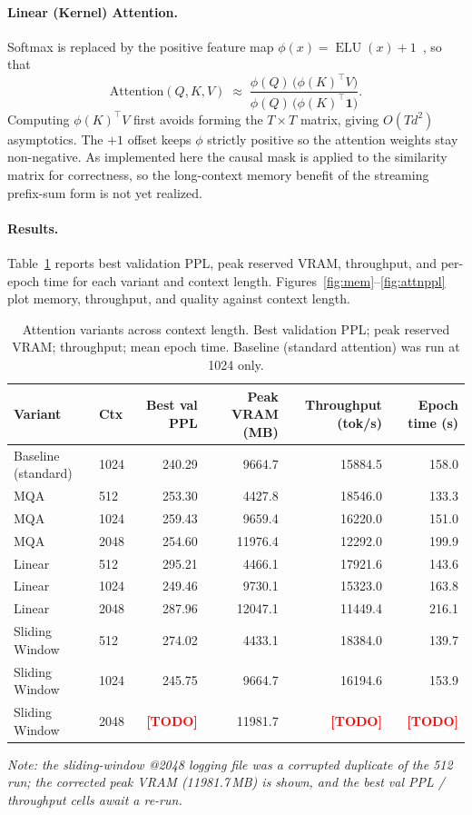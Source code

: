 \documentclass[11pt]{article}
\begin{document}
\paragraph{Linear (Kernel) Attention.} Softmax is replaced by the positive
feature map $\phi(x)=\operatorname{ELU}(x)+1$~\cite{katharopoulos2020}, so that
\[
\text{Attention}(Q,K,V)\;\approx\;\frac{\phi(Q)\,\big(\phi(K)^\top V\big)}
{\phi(Q)\,\big(\phi(K)^\top \mathbf{1}\big)}.
\]
Computing $\phi(K)^\top V$ first avoids forming the $T\times T$ matrix, giving
$O(Td^2)$ asymptotics. The $+1$ offset keeps $\phi$ strictly positive so the
attention weights stay non-negative. As implemented here the causal mask is
applied to the similarity matrix for correctness, so the long-context memory
benefit of the streaming prefix-sum form is not yet realized.

\paragraph{Results.} Table~\ref{tab:attn} reports best validation PPL, peak
reserved VRAM, throughput, and per-epoch time for each variant and context
length. Figures~\ref{fig:mem}--\ref{fig:attnppl} plot memory, throughput, and
quality against context length.

\begin{table}[H]
\centering
\caption{Attention variants across context length. Best validation PPL; peak
reserved VRAM; throughput; mean epoch time. Baseline (standard attention) was
run at 1024 only.}
\label{tab:attn}
\begin{tabular}{llrrrr}
\toprule
Variant & Ctx & Best val PPL & Peak VRAM (MB) & Throughput (tok/s) & Epoch time (s) \\
\midrule
Baseline (standard) & 1024 & 240.29 & 9664.7 & 15884.5 & 158.0 \\
\midrule
MQA            & 512  & 253.30 & 4427.8  & 18546.0 & 133.3 \\
MQA            & 1024 & 259.43 & 9659.4  & 16220.0 & 151.0 \\
MQA            & 2048 & 254.60 & 11976.4 & 12292.0 & 199.9 \\
\midrule
Linear         & 512  & 295.21 & 4466.1  & 17921.6 & 143.6 \\
Linear         & 1024 & 249.46 & 9730.1  & 15323.0 & 163.8 \\
Linear         & 2048 & 287.96 & 12047.1 & 11449.4 & 216.1 \\
\midrule
Sliding Window & 512  & 274.02 & 4433.1  & 18384.0 & 139.7 \\
Sliding Window & 1024 & 245.75 & 9664.7  & 16194.6 & 153.9 \\
Sliding Window & 2048 & \textcolor{red}{\textbf{[TODO]}} & 11981.7 & \textcolor{red}{\textbf{[TODO]}} & \textcolor{red}{\textbf{[TODO]}} \\
\bottomrule
\end{tabular}
\end{table}
\noindent\footnotesize\textit{Note: the sliding-window @2048 logging file was a
corrupted duplicate of the 512 run; the corrected peak VRAM (11981.7\,MB) is
shown, and the best val PPL / throughput cells await a re-run.}\normalsize
\end{document}
